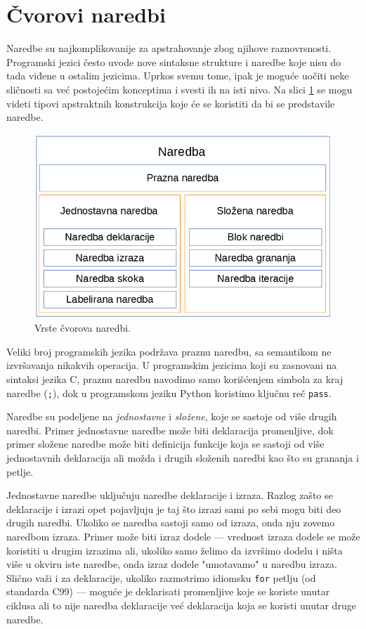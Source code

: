 \section{Čvorovi naredbi}
\label{sec:MyASTStatementNodes}

Naredbe su najkomplikovanije za apstrahovanje zbog njihove raznovrsnosti. Programski jezici često uvode nove sintaksne strukture i naredbe koje nisu do tada viđene u ostalim jezicima. Uprkos svemu tome, ipak je moguće uočiti neke sličnosti sa već postojećim konceptima i svesti ih na isti nivo. Na slici \ref{fig:StatementNodes} se mogu videti tipovi apstraktnih konstrukcija koje će se koristiti da bi se predstavile naredbe.

\begin{figure}[h!]
\centering
\includegraphics[scale=0.5]{images/statement_nodes.png}
\caption{Vrste čvorova naredbi.}
\label{fig:StatementNodes}
\end{figure}

Veliki broj programskih jezika podržava praznu naredbu, sa semantikom ne izvršavanja nikakvih operacija. U programskim jezicima koji su zasnovani na sintaksi jezika C, praznu naredbu navodimo samo korišćenjem simbola za kraj naredbe (\texttt{;}), dok u programskom jeziku Python koristimo ključnu reč \texttt{pass}. 

Naredbe su podeljene na \emph{jednostavne} i \emph{složene}, koje se sastoje od više drugih naredbi. Primer jednostavne naredbe može biti deklaracija promenljive, dok primer složene naredbe može biti definicija funkcije koja se sastoji od više jednostavnih deklaracija ali možda i drugih složenih naredbi kao što su grananja i petlje.

Jednostavne naredbe uključuju naredbe deklaracije i izraza. Razlog zašto se deklaracije i izrazi opet pojavljuju je taj što izrazi sami po sebi mogu biti deo drugih naredbi. Ukoliko se naredba sastoji samo od izraza, onda nju zovemo naredbom izraza. Primer može biti izraz dodele --- vrednost izraza dodele se može koristiti u drugim izrazima ali, ukoliko samo želimo da izvršimo dodelu i ništa više u okviru iste naredbe, onda izraz dodele "umotavamo" u naredbu izraza. Slično važi i za deklaracije, ukoliko razmotrimo idiomsku \texttt{for} petlju (od standarda C99) --- moguće je deklarisati promenljive koje se koriste unutar ciklusa ali to nije naredba deklaracije već deklaracija koja se koristi unutar druge naredbe. 

